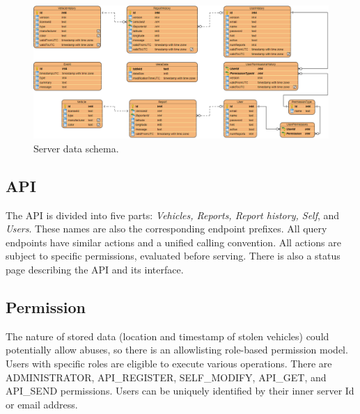\begin{figure}[htb]
 \centerline{\includegraphics[width=1.0\columnwidth]{.//Figure/System/ServerData.png}}
 \caption{Server data schema.}
 \label{fig:ServerData}
\end{figure}

\subsection{API}

The API is divided into five parts: \textit{Vehicles, Reports, Report history, Self}, and \textit{Users}. These names are also the corresponding endpoint prefixes. All query endpoints have similar actions and a unified calling convention. All actions are subject to specific permissions, evaluated before serving. There is also a status page describing the API and its interface.

\subsection{Permission}

The nature of stored data (location and timestamp of stolen vehicles) could potentially allow abuses, so there is an allowlisting role-based permission model. Users with specific roles are eligible to execute various operations. There are ADMINISTRATOR, API\_REGISTER, SELF\_MODIFY, API\_GET, and API\_SEND permissions. Users can be uniquely identified by their inner server Id or email address.

